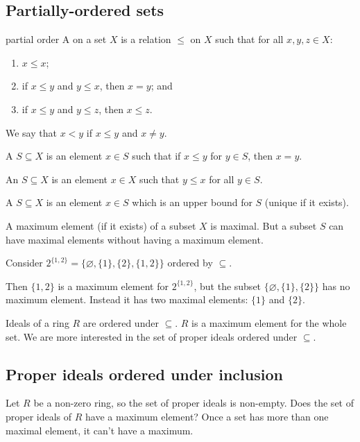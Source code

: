 \documentclass[12pt,letterpaper]{report}
\begin{document}
\pagebreak
\subsection{Partially-ordered sets}

\begin{defn}{partial order}{}
  A  on a set $X$ is a relation $\leq$ on $X$ such that for all
  $x, y, z \in X$:
  \begin{enumerate}
    \item $x \leq x$;
    \item if $x \leq y$ and $y \leq x$, then $x = y$; and
    \item if $x \leq y$ and $y \leq z$, then $x \leq z$.
  \end{enumerate}
  We say that $x < y$ if $x \leq y$ and $x \neq y$.

  A  $S \subseteq X$ is an element $x \in S$ such that if
  $x \leq y$ for $y \in S$, then $x = y$.

  An  $S \subseteq X$ is an element $x \in X$ such that $y \leq x$
  for all $y \in S$.

  A  $S \subseteq X$ is an element $x \in S$ which is an upper
  bound for $S$ (unique if it exists).
\end{defn}

A maximum element (if it exists) of a subset $X$ is maximal.
But a subset $S$ can have maximal elements without having a maximum element.

\begin{ex}
  Consider $2^{\{1, 2\}} = \{\varnothing, \{1\}, \{2\}, \{1, 2\}\}$ ordered by $\subseteq$.

  Then $\{1, 2\}$ is a maximum element for $2^{\{1, 2\}}$, but the subset
  $\{\varnothing, \{1\}, \{2\}\}$ has no maximum element.
  Instead it has two maximal elements: $\{1\}$ and $\{2\}$.
\end{ex}

Ideals of a ring $R$ are ordered under $\subseteq$.
$R$ is a maximum element for the whole set.
We are more interested in the set of proper ideals ordered under $\subseteq$.

\pagebreak
\subsection{Proper ideals ordered under inclusion}

Let $R$ be a non-zero ring, so the set of proper ideals is non-empty.
Does the set of proper ideals of $R$ have a maximum element?
Once a set has more than one maximal element, it can't have a maximum.
\end{document}
